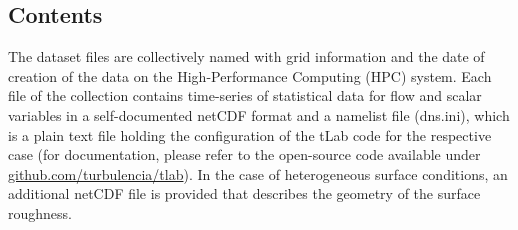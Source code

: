 \documentclass[11pt]{article}
\begin{document}
\subsection{Contents}
The dataset files are collectively named with grid information and the date of creation of the data on the High-Performance Computing (HPC) system. Each file of the collection contains time-series of statistical data for flow and scalar variables in a self-documented netCDF format and a namelist file (dns.ini), which is a plain text file holding the configuration of the tLab code for the respective case (for documentation, please refer to the open-source code available under \url{github.com/turbulencia/tlab}). In the case of heterogeneous surface conditions, an additional netCDF file is provided that describes the geometry of the surface roughness.

\end{document}
